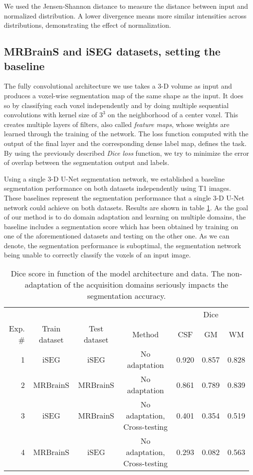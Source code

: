 \documentclass[preprint,12pt]{elsarticle}
\begin{document}
We used the Jensen-Shannon distance to measure the distance between input and normalized distribution. A lower divergence means more similar intensities across distributions, demonstrating the effect of normalization.

\subsection{MRBrainS and iSEG datasets, setting the baseline}

The fully convolutional architecture we use takes a 3-D volume as input and produces a voxel-wise segmentation map of the same shape as the input. It does so by classifying each voxel independently and by doing multiple sequential convolutions with kernel size of $3^3$ on the neighborhood of a center voxel. This creates multiple layers of filters, also called \textit{feature maps}, whose weights are learned through the training of the network. The loss function computed with the output of the final layer and the corresponding dense label map, defines the task. By using the previously described \textit{Dice loss} function, we try to minimize the error of overlap between the segmentation output and labels.

Using a single 3-D U-Net segmentation network, we established a baseline segmentation performance on both datasets independently using T1 images. These baselines represent the segmentation performance that a single 3-D U-Net network could achieve on both datasets. Results are shown in table \ref{table2}.
As the goal of our method is to do domain adaptation and learning on multiple domains, the baseline includes a segmentation score which has been obtained by training on one of the aforementioned datasets and testing on the other one. As we can denote, the segmentation performance is suboptimal, the segmentation network being unable to correctly classify the voxels of an input image.

\begin{table}
  \centering
  \begin{scriptsize}
  \begin{tabular}{r*{6}{c}}
    \toprule
    &  &  & & \multicolumn{3}{c}{Dice} \\
     \cmidrule(lr){5-7}
    Exp. \# & Train dataset & Test dataset & Method & CSF & GM & WM \\
    \midrule
    1 & iSEG & iSEG & No adaptation & 0.920 & 0.857 & 0.828 \\
    2 & MRBrainS & MRBrainS & No adaptation & 0.861 & 0.789 & 0.839 \\
    3 & iSEG & MRBrainS & No adaptation, Cross-testing & 0.401 & 0.354 & 0.519  \\
    4 & MRBrainS & iSEG & No adaptation, Cross-testing & 0.293 & 0.082 & 0.563  \\
    \bottomrule
  \end{tabular}
  \end{scriptsize}
  \caption{Dice score in function of the model architecture and data. The non-adaptation of the acquisition domains seriously impacts the segmentation accuracy.}
    \label{table2}
\end{table}
\end{document}
